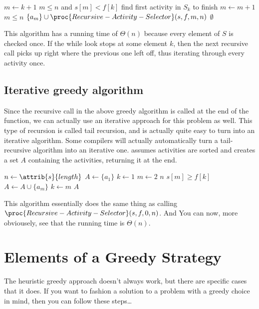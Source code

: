 \documentclass[11pt]{article}
\theoremstyle{definition}
\begin{document}
\begin{codebox}
  \li \(m \gets k+1\)
  \li \While \(m \leq n\) and \(s[m] < f[k]\) \Comment find first activity in \(S_k\) to finish
    \li \Do \(m \gets m+1\) \End 
  \li \If \(m \leq n\) \Then 
    \li \Return \(\{a_m\} \cup \proc{Recursive-Activity-Selector}(s,f,m,n)\) 
  \li \Else \Return \(\emptyset\) \End
\end{codebox}
This algorithm has a running time of \(\Theta(n)\) because every element of \(S\) is checked 
once.  If the while look stops at some element \(k\), then the next recursive call picks up 
right where the previous one left off, thus iterating through every activity once.

\subsection*{Iterative greedy algorithm}
Since the recursive call in the above greedy algorithm is called at the end of the function, we 
can actually use an iterative approach for this problem as well.  This type of recursion is 
called tail recursion, and is actually quite easy to turn into an iterative algorithm.  Some 
compilers will actually automatically turn a tail-recursive algorithm into an iterative one. 
 assumes activities are sorted and creates a set \(A\) 
containing the activities, returning it at the end.

\begin{codebox}
  \li \(n \gets \attrib{s}{length}\)
  \li \(A \gets \{a_1\}\)
  \li \(k \gets 1\)
  \li \For \(m \gets 2\) \To \(n\) \Do
    \li \If \(s[m] \geq f[k]\) \Then 
      \li \(A \gets A \cup \{a_m\}\)
      \li \(k \gets m\) \End \End
  \li \Return \(A\)
\end{codebox}

This algorithm essentially does the same thing as calling \(\proc{Recursive-Activity-Selector}(s,f,0,n)\). 
And You can now, more obviousely, see that the running time is \(\Theta(n)\).
\newpage 

\section*{Elements of a Greedy Strategy}
The heuristic greedy approach doesn't always work, but there are specific cases that it does. 
If you want to fashion a solution to a problem with a greedy choice in mind, then you can follow 
these steps\dots 
\end{document}
